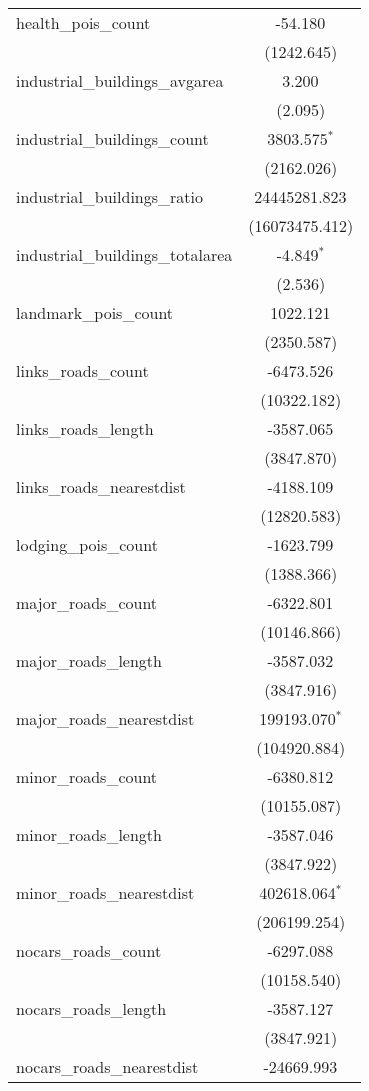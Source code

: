 \begin{table}[!htbp]
\begin{tabular}{@{\extracolsep{5pt}}lc}
 health_pois_count & -54.180$^{}$ \\
  & (1242.645) \\
 industrial_buildings_avgarea & 3.200$^{}$ \\
  & (2.095) \\
 industrial_buildings_count & 3803.575$^{*}$ \\
  & (2162.026) \\
 industrial_buildings_ratio & 24445281.823$^{}$ \\
  & (16073475.412) \\
 industrial_buildings_totalarea & -4.849$^{*}$ \\
  & (2.536) \\
 landmark_pois_count & 1022.121$^{}$ \\
  & (2350.587) \\
 links_roads_count & -6473.526$^{}$ \\
  & (10322.182) \\
 links_roads_length & -3587.065$^{}$ \\
  & (3847.870) \\
 links_roads_nearestdist & -4188.109$^{}$ \\
  & (12820.583) \\
 lodging_pois_count & -1623.799$^{}$ \\
  & (1388.366) \\
 major_roads_count & -6322.801$^{}$ \\
  & (10146.866) \\
 major_roads_length & -3587.032$^{}$ \\
  & (3847.916) \\
 major_roads_nearestdist & 199193.070$^{*}$ \\
  & (104920.884) \\
 minor_roads_count & -6380.812$^{}$ \\
  & (10155.087) \\
 minor_roads_length & -3587.046$^{}$ \\
  & (3847.922) \\
 minor_roads_nearestdist & 402618.064$^{*}$ \\
  & (206199.254) \\
 nocars_roads_count & -6297.088$^{}$ \\
  & (10158.540) \\
 nocars_roads_length & -3587.127$^{}$ \\
  & (3847.921) \\
 nocars_roads_nearestdist & -24669.993$^{}$ \\

\end{tabular}
\end{table}
